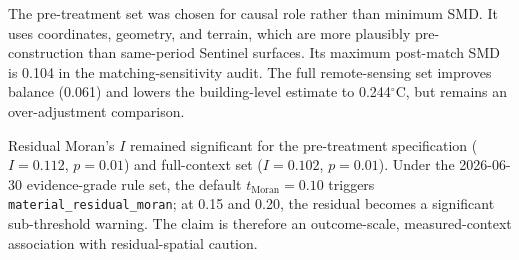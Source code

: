 \documentclass{article}
\newcommand{\ruleversion}{the 2026-06-30 evidence-grade rule set}
\begin{document}
\begin{table}[htbp]
\centering
\small
\caption{Chongqing UHI adjustment variants. \emph{pre\_treatment} is preferred because it avoids possible post-treatment Sentinel surfaces but slightly misses strict balance. Balance pass means maximum post-match SMD $<0.10$.}
\label{tab:chongqing}
\setlength{\tabcolsep}{4pt}
\end{table}

The pre-treatment set was chosen for causal role rather than minimum SMD. It uses coordinates, geometry, and terrain, which are more plausibly pre-construction than same-period Sentinel surfaces. Its maximum post-match SMD is 0.104 in the matching-sensitivity audit. The full remote-sensing set improves balance (0.061) and lowers the building-level estimate to 0.244$^\circ$C, but remains an over-adjustment comparison.

Residual Moran's $I$ remained significant for the pre-treatment specification ($I = 0.112$, $p = 0.01$) and full-context set ($I = 0.102$, $p = 0.01$). Under \ruleversion, the default $t_{\mathrm{Moran}}=0.10$ triggers \texttt{material\_residual\_moran}; at 0.15 and 0.20, the residual becomes a significant sub-threshold warning. The claim is therefore an outcome-scale, measured-context association with residual-spatial caution.
\end{document}
